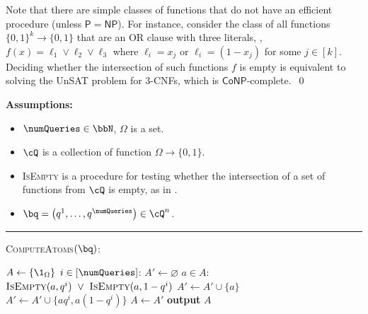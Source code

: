 \begin{remark}
	Note that there are simple classes of functions that do not have an efficient procedure {} (unless $\mathsf{P} = \mathsf{NP}$). For instance, consider the class of all functions $\{0,1\}^k \to \{0,1\}$ that are an OR clause with three literals, \ie, $f(x) = \ell_1 \vee \ell_2 \vee \ell_3$ where $\ell_i = x_j$ or $\ell_i = (1-x_j)$ for some $j \in [k]$. Deciding whether the intersection of such functions $f$ is empty is equivalent to solving the UnSAT problem for $3$-CNFs, which is $\mathsf{CoNP}$-complete.~\qed
\end{remark}

\begin{algorithmFloat}[H]
	\begin{ShadedAlgorithmBox}
		{\bfseries Assumptions:} 
		\begin{itemize}
			\item{
				$\numQueries \in \bbN$, $\Omega$ is a set.
			}
			\item{
				$\cQ$ is a collection of function $\Omega \to \{0,1\}$.
			}
			\item{
				\textsc{IsEmpty} is a procedure for testing whether the intersection of a set of functions from $\cQ$ is empty, as in .
			}
			\item{
				$\bq = \left(q^1,\dots,q^{\numQueries}\right) \in \cQ^n$.
			}
		\end{itemize}
		
		\noindent\rule{\textwidth}{0.5pt}
		
		\vspace*{0.5em}
		
		\textsc{ComputeAtoms}$(\bq)$:
		\begin{algorithmic}
			\vsp
			\State $A \gets \{\1_\Omega\}$
			\vsp
			\For $i \in [\numQueries]$:
				\State $A' \gets \varnothing$
				\For $a \in A$:
					\If $%
							\textsc{IsEmpty}(a,q^i)
						~ \lor ~ 
							\textsc{IsEmpty}(a,1-q^i)
						$
						\State $A' \gets A' \cup \{a\}$
					\Else
						\State $A' \gets A' \cup \{aq^i,a(1-q^i)\}$
					\EndIf
				\EndFor
				\State $A \gets A'$
			\EndFor
			\vsp
			\State \textbf{output} $A$
		\end{algorithmic}
	\end{ShadedAlgorithmBox}
	
	\caption{An algorithm for computing the atoms of a set of statistical queries.}

	\label{algorithm:compute-atoms}
\end{algorithmFloat}

